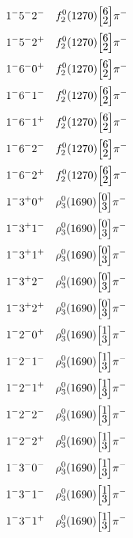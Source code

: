 \documentclass[10pt,a4paper]{article}
\def\dst{\displaystyle}
\def\vsp{\hbox{\vrule height12.5pt depth3.5pt width0pt}}
\def\ells#1#2{\Big[\hskip-5pt\vsp\begin{array}{c}\dst#1\\[-4pt]\dst#2\end{array}\vsp\hskip-5pt\Big]}
\begin{document}
\begin{align*} 
 \begin{aligned}
1^{-}5^{-}2^{-}\quad & f_2^0(1270)\ells{6}{2}\pi^-\\
1^{-}5^{-}2^{+}\quad & f_2^0(1270)\ells{6}{2}\pi^-\\
1^{-}6^{-}0^{+}\quad & f_2^0(1270)\ells{6}{2}\pi^-\\
1^{-}6^{-}1^{-}\quad & f_2^0(1270)\ells{6}{2}\pi^-\\
1^{-}6^{-}1^{+}\quad & f_2^0(1270)\ells{6}{2}\pi^-\\
1^{-}6^{-}2^{-}\quad & f_2^0(1270)\ells{6}{2}\pi^-\\
1^{-}6^{-}2^{+}\quad & f_2^0(1270)\ells{6}{2}\pi^-\\
1^{-}3^{+}0^{+}\quad & \rho_3^0(1690)\ells{0}{3}\pi^-\\
1^{-}3^{+}1^{-}\quad & \rho_3^0(1690)\ells{0}{3}\pi^-\\
1^{-}3^{+}1^{+}\quad & \rho_3^0(1690)\ells{0}{3}\pi^-\\
1^{-}3^{+}2^{-}\quad & \rho_3^0(1690)\ells{0}{3}\pi^-\\
1^{-}3^{+}2^{+}\quad & \rho_3^0(1690)\ells{0}{3}\pi^-\\
1^{-}2^{-}0^{+}\quad & \rho_3^0(1690)\ells{1}{3}\pi^-\\
1^{-}2^{-}1^{-}\quad & \rho_3^0(1690)\ells{1}{3}\pi^-\\
1^{-}2^{-}1^{+}\quad & \rho_3^0(1690)\ells{1}{3}\pi^-\\
1^{-}2^{-}2^{-}\quad & \rho_3^0(1690)\ells{1}{3}\pi^-\\
1^{-}2^{-}2^{+}\quad & \rho_3^0(1690)\ells{1}{3}\pi^-\\
1^{-}3^{-}0^{-}\quad & \rho_3^0(1690)\ells{1}{3}\pi^-\\
1^{-}3^{-}1^{-}\quad & \rho_3^0(1690)\ells{1}{3}\pi^-\\
1^{-}3^{-}1^{+}\quad & \rho_3^0(1690)\ells{1}{3}\pi^-\\
\end{aligned} 
 \end{align*}\pagebreak
\end{document}
